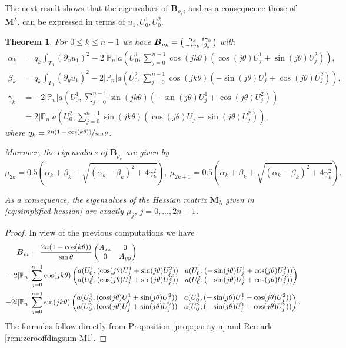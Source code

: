 \documentclass[JEP,XML,SOM,Unicode,ThmDefs,NoFloatCountersInSection,published]{cedram}
\newenvironment{smallpmatrix}{\big(\begin{smallmatrix}}{\end{smallmatrix}\big)}
\newcommand{\colsep}{\arraycolsep4.5pt}
\theoremstyle{plain}
\newtheorem{thm}{Theorem}[section]
\theoremstyle{definition}
\newcommand{\bo}[1]{{\boldsymbol#1}}
\def\Pp{{\mathbb{P}_n}}
\begin{document}
The next result shows that the eigenvalues of $\bo B_{\rho_k}$, and as a consequence those of~$\bo M^\lambda$, can be expressed in terms of $u_1,U_0^1,U_0^2$.
\begin{thm}
For $0\leq k \leq n-1$ we have $\bo B_{\rho_k} = \begin{smallpmatrix}
\alpha_k & i\gamma_k \\-i \gamma_k & \beta_k
\end{smallpmatrix}$
with
\begin{align*}
\alpha_k & = q_k\int_{T_0}(\partial_x u_1)^2-2|\Pp| a(U_0^1,\sum_{j=0}^{n-1} \cos(jk\theta)(\cos (j\theta) U_j^1+\sin (j\theta) U_j^2)), \\
\beta_k & = q_k\int_{T_0} (\partial_y u_1)^2 -2|\Pp| a(U_0^2,\sum_{j=0}^{n-1} \cos(jk\theta)(-\sin (j\theta) U_j^1+\cos (j\theta) U_j^2)),\\
\gamma_k & = -2|\Pp|a(U_0^1,\sum_{j=0}^{n-1} \sin(jk\theta)(-\sin (j\theta) U_j^1+\cos (j\theta) U_j^2))\\ & = 2|\Pp|a(U_0^2,\sum_{j=0}^{n-1} \sin(jk\theta)(\cos (j\theta) U_j^1+\sin (j\theta) U_j^2)),
\end{align*}
where $q_k=\sfrac{2n(1-\cos(k\theta))}{\sin \theta}$.

Moreover, the eigenvalues of $\bo B_{\rho_k}$ are given by
\[
\mu_{2k} = 0.5(\alpha_k+\beta_k- \sqrt{(\alpha_k-\beta_k)^2+4\gamma_k^2}), \ \mu_{2k+1} = 0.5(\alpha_k+\beta_k+ \sqrt{(\alpha_k-\beta_k)^2+4\gamma_k^2}).
\]

As a consequence, the eigenvalues of the Hessian matrix $\bo M_\lambda$ given in \eqref{eq:simplified-hessian} are exactly $\mu_j$, $j=0,\dots,2n-1$.
\label{thm:explicit-eigenvalues}
\end{thm}

\begin{proof} In view of the previous computations we have
{\small \begin{align*}
\bo B_{\rho_k} & = \frac{2n(1-\cos (k\theta))}{\sin \theta} \begin{pmatrix}
A_{xx}& 0 \\
0 & A_{yy}
\end{pmatrix} \\
-2|\Pp| &\colsep\sum_{j=0}^{n-1}\cos(jk\theta)\begin{pmatrix}
a(U_0^1, (\cos (j\theta) U_j^1+\sin (j\theta) U_j^2)) & a(U_0^1, (-\sin (j\theta) U_j^1+\cos (j\theta) U_j^2)) \\
a(U_0^2, (\cos (j\theta) U_j^1+\sin (j\theta) U_j^2)) &
a(U_0^2, (-\sin (j\theta) U_j^1+\cos (j\theta) U_j^2))
\end{pmatrix}\\
-2i|\Pp| & \colsep\sum_{j=0}^{n-1} \sin(jk\theta)\begin{pmatrix}
a(U_0^1,(\cos (j\theta) U_j^1+\sin (j\theta) U_j^2)) & a(U_0^1,(-\sin (j\theta) U_j^1+\cos (j\theta) U_j^2)) \\
a(U_0^2,(\cos (j\theta) U_j^1+\sin (j\theta) U_j^2)) &
a(U_0^2,(-\sin (j\theta) U_j^1+\cos (j\theta) U_j^2))
\end{pmatrix}.
\end{align*}
}
The formulas follow directly from Proposition \ref{prop:parity-u} and Remark \ref{rem:zerooffdiagsum-M1}.
\end{proof}
\end{document}
